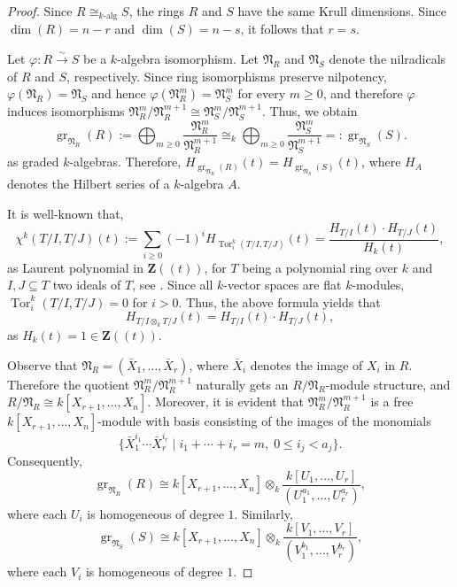 \documentclass[10pt,a4paper]{amsart}
\numberwithin{equation}{section}
\numberwithin{figure}{section}
\numberwithin{equation}{section}
\newcommand{\Z}{\mathbf{Z}}
\newcommand{\Tor}{\operatorname{Tor}}
\begin{document}
\begin{proof}
Since $R\cong_{k\text{-alg}} S$, the rings $R$ and $S$ have the same Krull dimensions. Since $\dim(R)=n-r$ and $\dim(S)=n-s$, it follows that $r=s$.

Let $\varphi:R\xrightarrow{\sim}S$ be a $k$-algebra isomorphism. Let $\mathfrak{N}_R$ and $\mathfrak{N}_S$ denote the nilradicals of $R$ and $S$, respectively. Since ring isomorphisms preserve nilpotency, $\varphi(\mathfrak N_R)=\mathfrak N_S$ and hence $\varphi(\mathfrak N_R^m)=\mathfrak N_S^m$
for every $m\ge0$, and therefore $\varphi$ induces isomorphisms $\mathfrak N_R^m/\mathfrak N_R^{m+1} \cong
\mathfrak N_S^m/\mathfrak N_S^{m+1}$. Thus, we obtain
\[
\operatorname{gr}_{\mathfrak{N}_R}(R)
:=
\bigoplus_{m\geq 0}
\frac{\mathfrak{N}_R^m}{\mathfrak{N}_R^{m+1}}
\cong_k
\bigoplus_{m\geq 0}
\frac{\mathfrak{N}_S^m}{\mathfrak{N}_S^{m+1}}
=: \operatorname{gr}_{\mathfrak{N}_S}(S).
\]
as graded $k$-algebras. Therefore, $H_{\operatorname{gr}_{\mathfrak{N}_R}(R)}(t)= H_{\operatorname{gr}_{\mathfrak{N}_S}(S)}(t)$,
where $H_{A}$ denotes the Hilbert series of a $k$-algebra $A$. 

It is well-known that, $$\chi^k(T/I, T/J)(t) :=\sum\limits_{i\geq 0}(-1)^i H_{\Tor^k_i(T/I,T/J)}(t)=\frac{H_{T/I}(t)\cdot H_{T/J}(t)}{H_{k}(t)},$$ as Laurent polynomial in $\Z(\!(t)\!)$, for $T$ being a polynomial ring over $k$ and $I, J \subseteq T$ two ideals of $T$, see \cite{AB1993}. Since all $k$-vector spaces are flat $k$-modules, $\Tor^k_i(T/I,T/J)=0$ for $i>0$. Thus, the above formula yields that 
\begin{equation}\label{eq:mult_of_Hilbert_series}
    H_{T/I\otimes_k T/J}(t)=H_{T/I}(t)\cdot H_{T/J}(t),
\end{equation} 
as $H_{k}(t)=1 \in \Z(\!(t)\!)$.

Observe that $\mathfrak{N}_R=(\bar{X}_1,\ldots,\bar{X}_r)$, where $\bar{X}_i$ denotes the image of $X_i$ in $R$. Therefore the quotient $\mathfrak N_R^m/\mathfrak N_R^{m+1}$ naturally gets an $R/\mathfrak{N}_R$-module structure, and $R/\mathfrak{N}_R \cong k[X_{r+1},\ldots,X_n]$. Moreover, it is evident that $\mathfrak N_R^m/\mathfrak N_R^{m+1}$ is a free $k[X_{r+1},\ldots,X_n]$-module with basis consisting of the images of the monomials
\[
\{\bar{X}_1^{i_1}\cdots \bar{X}_r^{i_r}
\mid
i_1+\cdots+i_r=m,\;
0\le i_j<a_j
\}.
\]
Consequently,
\[
\operatorname{gr}_{\mathfrak N_R}(R)
\cong
k[X_{r+1},\ldots,X_n]
\otimes_k
\frac{k[U_1,\ldots,U_r]}
{(U_1^{a_1},\ldots,U_r^{a_r})},
\]
where each $U_i$ is homogeneous of degree $1$. Similarly,
\[
\operatorname{gr}_{\mathfrak{N}_S}(S)
\cong
k[X_{r+1},\ldots,X_n]
\otimes_k
\frac{k[V_1,\ldots,V_r]}
{(V_1^{b_1},\ldots,V_r^{b_r})},
\]
where each $V_i$ is homogeneous of degree $1$.


\end{proof}
\end{document}
